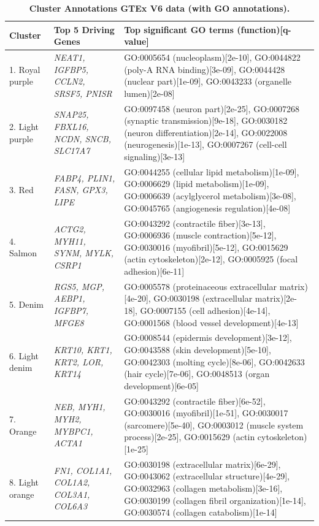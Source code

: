 \documentclass[10pt,letterpaper]{article}
\begin{document}
\clearpage
\begin{table}[!hp]
\begin{adjustwidth}{-2in}{0in} %
\scriptsize
\centering
\caption{\bf Cluster Annotations GTEx V6 data (with GO annotations).}
\renewcommand{\arraystretch}{1.7}
\begin{tabular}{|p{1.0in}|p{1.5in}|p{4.5in}|}
\hline
Cluster & Top 5 Driving \qquad Genes  &  Top significant GO terms (function)[q-value] \\
\hline
1. Royal purple & \textit{NEAT1, IGFBP5, CCLN2, SRSF5, PNISR} & GO:0005654 (nucleoplasm)[2e-10], GO:0044822 (poly-A RNA binding)[3e-09], GO:0044428 (nuclear part)[1e-09], GO:0043233 (organelle lumen)[2e-08]  \\ \hline
2. Light purple & \textit{SNAP25, FBXL16, NCDN, SNCB, SLC17A7} & GO:0097458 (neuron part)[2e-25], GO:0007268 (synaptic transmission)[9e-18], GO:0030182 (neuron differentiation)[2e-14], GO:0022008 (neurogenesis)[1e-13], GO:0007267 (cell-cell signaling)[3e-13]\\ \hline
3. Red & \textit{FABP4, PLIN1, FASN, GPX3, LIPE} & GO:0044255 (cellular lipid metabolism)[1e-09], GO:0006629 (lipid metabolism)[1e-09], GO:0006639 (acylglycerol metabolism)[3e-08], GO:0045765 (angiogenesis regulation)[4e-08]\\ \hline
4. Salmon & \textit{ACTG2, MYH11, SYNM, MYLK, CSRP1} & GO:0043292 (contractile fiber)[3e-13], GO:0006936 (muscle contraction)[5e-12], GO:0030016 (myofibril)[5e-12], GO:0015629 (actin cytoskeleton)[2e-12],  GO:0005925 (focal adhesion)[6e-11] \\ \hline
5. Denim & \textit{RGS5, MGP,  AEBP1, IGFBP7, MFGE8} & GO:0005578 (proteinaceous extracellular matrix)[4e-20], GO:0030198 (extracellular matrix)[2e-18], GO:0007155 (cell adhesion)[4e-14], GO:0001568 (blood vessel development)[4e-13] \\ \hline
6. Light denim & \textit{KRT10, KRT1, KRT2, LOR, KRT14} & GO:0008544 (epidermis development)[3e-12], GO:0043588 (skin development)[5e-10], GO:0042303 (molting cycle)[8e-06], GO:0042633 (hair cycle)[7e-06], GO:0048513 (organ development)[6e-05] \\ \hline
7. Orange & \textit{NEB, MYH1, MYH2, MYBPC1, ACTA1} & GO:0043292 (contractile fiber)[6e-52], GO:0030016 (myofibril)[1e-51], GO:0030017 (sarcomere)[5e-40], GO:0003012 (muscle system process)[2e-25], GO:0015629 (actin cytoskeleton)[1e-25] \\ \hline
8. Light orange & \textit{FN1, COL1A1, COL1A2, COL3A1, COL6A3} & GO:0030198 (extracellular matrix)[6e-29], GO:0043062 (extracellular structure)[4e-29], GO:0032963 (collagen metabolism)[3e-16], GO:0030199 (collagen fibril organization)[1e-14], GO:0030574 (collagen catabolism)[1e-14] \\ \hline

\end{tabular}
\end{adjustwidth}
\end{table}
\end{document}
